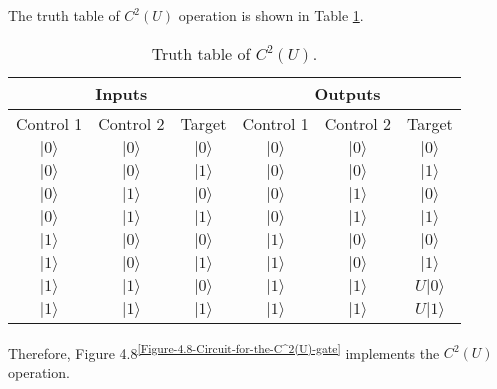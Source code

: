 \documentclass[en]{sol-man}
\begin{document}
\begin{pf}
    The truth table of $C^2(U)$ operation is shown in Table \ref{E4.21-C2U-truth-table}.
    \begin{table}[h]
        \centering
        \caption{Truth table of $C^2(U)$.}
        \label{E4.21-C2U-truth-table}
        \begin{tabular}{|c|c|c|c|c|c|}
        \hline
        \multicolumn{3}{|c|}{Inputs} & \multicolumn{3}{c|}{Outputs} \\ \hline
        Control 1 & Control 2 & Target & Control 1 & Control 2 & Target \\ \hline
        $\lvert 0\rangle$ & $\lvert 0\rangle$ & $\lvert 0\rangle$ & $\lvert 0\rangle$ & $\lvert 0\rangle$ & $\lvert 0\rangle$ \\ \hline
        $\lvert 0\rangle$ & $\lvert 0\rangle$ & $\lvert 1\rangle$ & $\lvert 0\rangle$ & $\lvert 0\rangle$ & $\lvert 1\rangle$ \\ \hline
        $\lvert 0\rangle$ & $\lvert 1\rangle$ & $\lvert 0\rangle$ & $\lvert 0\rangle$ & $\lvert 1\rangle$ & $\lvert 0\rangle$ \\ \hline
        $\lvert 0\rangle$ & $\lvert 1\rangle$ & $\lvert 1\rangle$ & $\lvert 0\rangle$ & $\lvert 1\rangle$ & $\lvert 1\rangle$ \\ \hline
        $\lvert 1\rangle$ & $\lvert 0\rangle$ & $\lvert 0\rangle$ & $\lvert 1\rangle$ & $\lvert 0\rangle$ & $\lvert 0\rangle$ \\ \hline
        $\lvert 1\rangle$ & $\lvert 0\rangle$ & $\lvert 1\rangle$ & $\lvert 1\rangle$ & $\lvert 0\rangle$ & $\lvert 1\rangle$ \\ \hline
        $\lvert 1\rangle$ & $\lvert 1\rangle$ & $\lvert 0\rangle$ & $\lvert 1\rangle$ & $\lvert 1\rangle$ & $U\lvert 0\rangle$ \\ \hline
        $\lvert 1\rangle$ & $\lvert 1\rangle$ & $\lvert 1\rangle$ & $\lvert 1\rangle$ & $\lvert 1\rangle$ & $U\lvert 1\rangle$ \\ \hline
        \end{tabular}
    \end{table}

    Therefore, Figure 4.8\textsuperscript{\ref{Figure-4.8-Circuit-for-the-C^2(U)-gate}} implements the $C^2(U)$ operation.
\end{pf}
\end{document}
